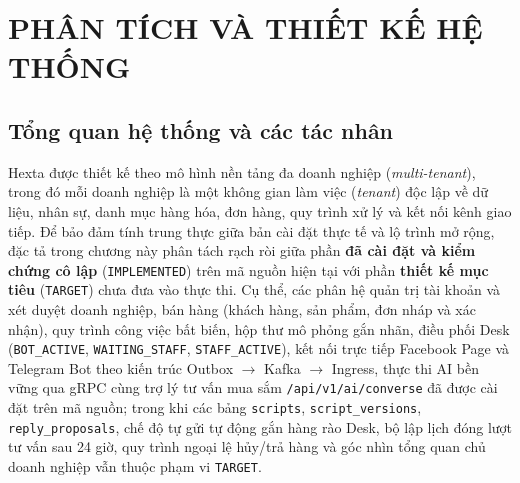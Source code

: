 \chapter{PHÂN TÍCH VÀ THIẾT KẾ HỆ THỐNG}\label{chap:design}

\section{Tổng quan hệ thống và các tác nhân}
Hexta được thiết kế theo mô hình nền tảng đa doanh nghiệp (\emph{multi-tenant}), trong đó mỗi doanh nghiệp là một không gian làm việc (\emph{tenant}) độc lập về dữ liệu, nhân sự, danh mục hàng hóa, đơn hàng, quy trình xử lý và kết nối kênh giao tiếp.
Để bảo đảm tính trung thực giữa bản cài đặt thực tế và lộ trình mở rộng, đặc tả trong chương này phân tách rạch ròi giữa phần \textbf{đã cài đặt và kiểm chứng cô lập} (\texttt{IMPLEMENTED}) trên mã nguồn hiện tại với phần \textbf{thiết kế mục tiêu} (\texttt{TARGET}) chưa đưa vào thực thi.
Cụ thể, các phân hệ quản trị tài khoản và xét duyệt doanh nghiệp, bán hàng (khách hàng, sản phẩm, đơn nháp và xác nhận), quy trình công việc bất biến, hộp thư mô phỏng gắn nhãn, điều phối Desk (\texttt{BOT\_\hspace{0pt}ACTIVE}, \texttt{WAITING\_\hspace{0pt}STAFF}, \texttt{STAFF\_\hspace{0pt}ACTIVE}), kết nối trực tiếp Facebook Page và Telegram Bot theo kiến trúc Outbox $\rightarrow$ Kafka $\rightarrow$ Ingress, thực thi AI bền vững qua gRPC cùng trợ lý tư vấn mua sắm \texttt{/api/\hspace{0pt}v1/\hspace{0pt}ai/\hspace{0pt}converse} đã được cài đặt trên mã nguồn; trong khi các bảng \texttt{scripts}, \texttt{script\_\hspace{0pt}versions}, \texttt{reply\_\hspace{0pt}proposals}, chế độ tự gửi tự động gắn hàng rào Desk, bộ lập lịch đóng lượt tư vấn sau 24 giờ, quy trình ngoại lệ hủy/trả hàng và góc nhìn tổng quan chủ doanh nghiệp vẫn thuộc phạm vi \texttt{TARGET}.

